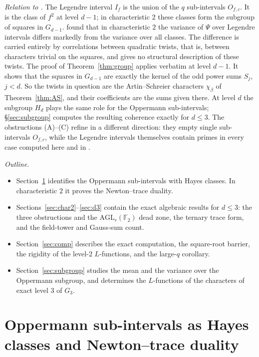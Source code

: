 \documentclass[11pt,a4paper]{amsart}
\theoremstyle{definition}
\theoremstyle{remark}
\newcommand{\F}{\mathbb{F}}
\newcommand{\AGL}{\mathrm{AGL}}
\begin{document}
\emph{Relation to \cite{ChenI}.} The Legendre interval $I_f$ is the union of the $q$ sub-intervals $O_{f,c}$. It is
the class of $f^2$ at level $d-1$; in characteristic $2$ these classes form the subgroup of squares in $G_{d-1}$.
\cite{ChenI} found that in characteristic $2$ the variance of $\Psi$ over Legendre intervals differs markedly from
the variance over all classes. The difference is carried entirely by correlations between quadratic twists, that is,
between characters trivial on the squares, and \cite{ChenI} gives no structural description of these twists. The
proof of Theorem~\ref{thm:group} applies verbatim at level $d-1$. It shows that the squares in $G_{d-1}$ are exactly
the kernel of the odd power sums $S_j$, $j<d$. So the twists in question are the Artin--Schreier characters
$\chi_\beta$ of Theorem~\ref{thm:AS}, and their coefficients are the sums given there. At level $d$ the subgroup $H_d$
plays the same role for the Oppermann sub-intervals; \S\ref{sec:subgroup} computes the resulting coherence exactly
for $d\le3$. The obstructions (A)--(C) refine \cite{ChenI} in a different direction: they empty single sub-intervals
$O_{f,c}$, while the Legendre intervals themselves contain primes in every case computed here and in \cite{ChenI}.

\emph{Outline.}
\begin{itemize}
\item Section~\ref{sec:classes} identifies the Oppermann sub-intervals with Hayes classes. In characteristic $2$ it
proves the Newton--trace duality.
\item Sections~\ref{sec:char2}--\ref{sec:d3} contain the exact algebraic results for $d\le3$: the three obstructions
and the $\AGL_r(\F_2)$ dead zone, the ternary trace form, and the field-tower and Gauss-sum count.
\item Section~\ref{sec:comp} describes the exact computation, the square-root barrier, the rigidity of the level-$2$
$L$-functions, and the large-$q$ corollary.
\item Section~\ref{sec:subgroup} studies the mean and the variance over the Oppermann subgroup, and determines the
$L$-functions of the characters of exact level $3$ of $G_3$.
\end{itemize}


\section{Oppermann sub-intervals as Hayes classes and Newton--trace duality}\label{sec:classes}
\end{document}

